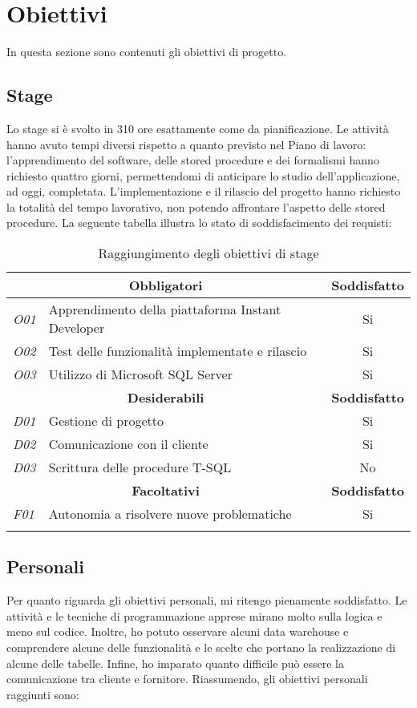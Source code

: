\section{Obiettivi}
In questa sezione sono contenuti gli obiettivi di progetto.

\subsection{Stage}
Lo stage si è svolto in 310 ore esattamente come da pianificazione. Le attività hanno avuto tempi diversi rispetto a quanto previsto nel Piano di lavoro: l'apprendimento del software, delle stored procedure e dei formalismi hanno richiesto quattro giorni, permettendomi di anticipare lo studio dell'applicazione, ad oggi, completata.  L'implementazione e il rilascio del progetto hanno richiesto la totalità del tempo lavorativo, non potendo affrontare l'aspetto delle stored procedure. 
La seguente tabella illustra lo stato di soddisfacimento dei requisti:


	\begin{longtable}{ l|l|c }
		\hline
		
		\multicolumn{2}{c}{\textbf{Obbligatori}} & \textbf{Soddisfatto} \\
		\hline
		\textit{O01} & Apprendimento della piattaforma Instant Developer & Si\\
		\textit{O02} & Test delle funzionalità implementate e rilascio & Si\\
		\textit{O03} & Utilizzo di Microsoft SQL Server& Si\\
		\hline
		\multicolumn{2}{c}{\textbf{Desiderabili}} & \textbf{Soddisfatto}\\
		\hline
		\textit{D01} & Gestione di progetto & Si\\
		\textit{D02} & Comunicazione con il cliente & Si\\
		\textit{D03} & Scrittura delle procedure T-SQL& No\\
		\hline
		\multicolumn{2}{c}{\textbf{Facoltativi}} & \textbf{Soddisfatto}\\
		\hline
		\textit{F01} & Autonomia a risolvere nuove problematiche & Si\\
\caption{Raggiungimento degli obiettivi di stage}
		
	\end{longtable}
	

\subsection{Personali}
Per quanto riguarda gli obiettivi personali, mi ritengo pienamente soddisfatto. Le attività e le tecniche di programmazione apprese mirano molto sulla logica e meno sul codice. Inoltre, ho potuto osservare alcuni data warehouse e comprendere alcune delle funzionalità e le scelte che portano la realizzazione di alcune delle tabelle. Infine, ho imparato quanto difficile può essere la comunicazione tra cliente e fornitore.
Riassumendo, gli obiettivi personali raggiunti sono:


